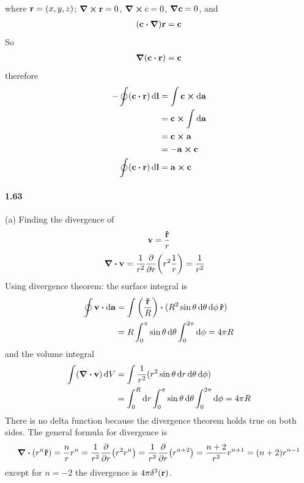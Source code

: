 \documentclass[../main.tex]{subfiles}
\begin{document}
where $\vb{r} = (x,y,z)$; $\curl \vb{r} = 0$, $\curl c = 0$, $\grad \vb{c} = 0$, and
\begin{align*}
    (\vb{c} \vdot \grad)\vb{r} = \vb{c} 
\end{align*}
So
\begin{align*}
    \grad(\vb{c} \vdot \vb{r}) = \vb{c}
\end{align*}
therefore
\begin{align*}
    - \oint (\vb{c} \vdot \vb{r}) \dd{\vb{l}} &= \int \vb{c} \cp \dd{\vb{a}}   \\
    &= \vb{c} \cp \int \dd{\vb{a}} \\
    &= \vb{c} \cp \vb{a} \\
    &= - \vb{a} \cp \vb{c} \\
    \oint (\vb{c} \vdot \vb{r}) \dd{\vb{l}} &= \vb{a} \cp \vb{c}
\end{align*}

\paragraph{1.63}
(a) Finding the divergence of
\begin{align*}
    \vb{v} = \frac{\vu{r}}{r}
\end{align*}
\begin{align*}
    \div \vb{v} &= \frac{1}{r^2} \pdv{r} (r^2 \frac{1}{r}) = \frac{1}{r^2}
\end{align*}
Using divergence theorem: the surface integral is
\begin{align*}
    \oint \vb{v} \vdot \dd{\vb{a}} &= \int \qt(\frac{\vu{r}}{R}) \vdot 
        (R^2 \sin\theta \dd{\theta} \dd{\phi} \vu{r}) \\
    &= R \int_0^{\pi} \sin\theta \dd{\theta} \int_0^{2\pi} \dd{\phi} = 4\pi R
\end{align*}
and the volume integral
\begin{align*}
    \int (\div \vb{v}) \dd{V} &= \int \frac{1}{r^2} (r^2 \sin\theta \dd{r} \dd{\theta} \dd{\phi}) \\
    &= \int_0^R \dd{r} \int_0^{\pi} \sin\theta \dd{\theta} \int_0^{2\pi} \dd{\phi} = 4\pi R
\end{align*}
There is no delta function because the divergence theorem holds true on both sides. The general 
formula for divergence is 
\begin{align*}
    \div (r^{n} \vu{r}) = \frac{n}{r} r^{n} = \frac{1}{r^2} \pdv{r} (r^2 r^{n}) 
        = \frac{1}{r^2} \pdv{r} (r^{n+2}) = \frac{n+2}{r^2} r^{n+1} = (n+2) r^{n-1}
\end{align*}
except for $n = -2$ the divergence is $4\pi \delta^3(\vb{r})$.
\end{document}
